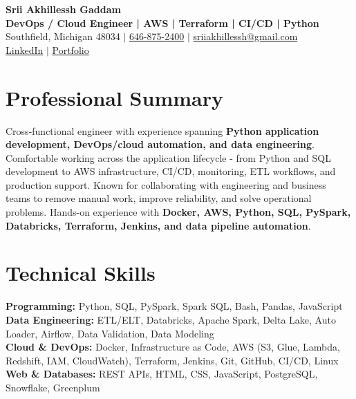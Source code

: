 \documentclass[letterpaper,10pt]{article}
\begin{document}
\fontsize{9.35pt}{10.45pt}\selectfont

\begin{center}
    {\LARGE \textbf{Srii Akhillessh Gaddam}} \\[-1pt]
    \textbf{DevOps / Cloud Engineer | AWS | Terraform | CI/CD | Python} \\[2pt]
    Southfield, Michigan 48034 $|$
    \href{tel:6468752400}{646-875-2400} $|$
    \href{mailto:sriiakhillessh@gmail.com}{sriiakhillessh@gmail.com} \\[1pt]
    \href{https://www.linkedin.com/in/srii-akhiilessh-gaddam-b48668191/}{LinkedIn} $|$
    \href{https://sriiakhillesshg.github.io/portfolio/}{Portfolio}
\end{center}
\vspace{-8pt}

\section{Professional Summary}
\small{Cross-functional engineer with experience spanning \textbf{Python application development, DevOps/cloud automation, and data engineering}. Comfortable working across the application lifecycle - from Python and SQL development to AWS infrastructure, CI/CD, monitoring, ETL workflows, and production support. Known for collaborating with engineering and business teams to remove manual work, improve reliability, and solve operational problems. Hands-on experience with \textbf{Docker, AWS, Python, SQL, PySpark, Databricks, Terraform, Jenkins, and data pipeline automation}.}

\section{Technical Skills}
\small{
\textbf{Programming:} Python, SQL, PySpark, Spark SQL, Bash, Pandas, JavaScript \\
\textbf{Data Engineering:} ETL/ELT, Databricks, Apache Spark, Delta Lake, Auto Loader, Airflow, Data Validation, Data Modeling \\
\textbf{Cloud \& DevOps:} Docker, Infrastructure as Code, AWS (S3, Glue, Lambda, Redshift, IAM, CloudWatch), Terraform, Jenkins, Git, GitHub, CI/CD, Linux \\
\textbf{Web \& Databases:} REST APIs, HTML, CSS, JavaScript, PostgreSQL, Snowflake, Greenplum
}
\end{document}
